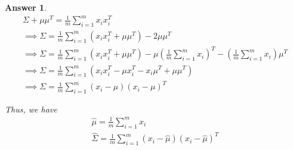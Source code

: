 \documentclass[12pt]{article}
\theoremstyle{colon}
\newtheorem*{answer}{Answer}
\begin{document}
\begin{answer}
  \begin{gather*}
    \Sigma + \mu \mu^T = \frac{1}{m} \sum_{i=1}^m x_i x_i^T \\
    \implies \Sigma = \frac{1}{m} \sum_{i=1}^m (x_i x_i^T + \mu \mu^T) - 2 \mu \mu^T\\
    \implies \Sigma = \frac{1}{m} \sum_{i=1}^m (x_i x_i^T + \mu \mu^T) - \mu \left( \frac{1}{m} \sum_{i=1}^m x_i \right)^T - \left( \frac{1}{m} \sum_{i=1}^m x_i \right) \mu^T\\
    \implies \Sigma = \frac{1}{m} \sum_{i=1}^m (x_i x_i^T - \mu x_i^T - x_i \mu^T + \mu \mu^T) \\
    \implies \Sigma = \frac{1}{m} \sum_{i=1}^m (x_i - \mu)(x_i - \mu)^T
  \end{gather*}

  Thus, we have
  \begin{gather*}
    \hat{\mu} = \frac{1}{m} \sum_{i=1}^m x_i \\
    \hat{\Sigma} = \frac{1}{m} \sum_{i=1}^m (x_i - \hat{\mu})(x_i - \hat{\mu})^T
  \end{gather*}
\end{answer}

\clearpage
\end{document}
